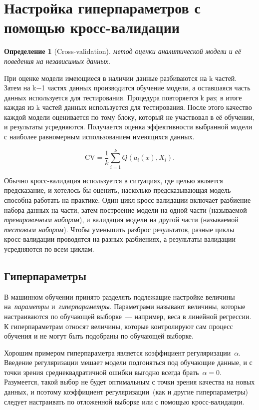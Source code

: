 \documentclass[a4paper, 12pt]{article}
\theoremstyle{plain} %
\newtheorem{definition}{Определение}
\theoremstyle{definition} %
\theoremstyle{remark} %
\begin{document}
\section{Настройка гиперпараметров с помощью кросс-валидации}

\begin{definition}[Cross-validation]
	метод оценки аналитической модели и её поведения на независимых данных.
\end{definition}
	При оценке модели имеющиеся в наличии данные разбиваются на k частей. Затем на k−1 частях данных производится обучение модели, а оставшаяся часть данных используется для тестирования. Процедура повторяется k раз; в итоге каждая из k частей данных используется для тестирования. После этого качество каждой модели оценивается по тому блоку, который не участвовал в её обучении,
	и результаты усредняются. Получается оценка эффективности выбранной модели с наиболее равномерным использованием имеющихся данных.

	\[
	    \text{CV}
	    =
	    \frac{1}{k}
	    \sum_{i = 1}^{k}
	        Q\left( a_i(x), X_i \right).
	\]

\vspace{1em}
	Обычно кросс-валидация используется в ситуациях, где целью является предсказание, и хотелось бы оценить, насколько предсказывающая модель способна работать на практике. Один цикл кросс-валидации включает разбиение набора данных на части, затем построение модели на одной части (называемой \emph{тренировочным набором}), и валидация модели на другой части (называемой \emph{тестовым набором}). Чтобы уменьшить разброс результатов, разные циклы кросс-валидации проводятся на разных разбиениях, а результаты валидации усредняются по всем циклам.

\subsection{Гиперпараметры}

	В машинном обучении принято разделять подлежащие настройке величины
	на~\emph{параметры} и~\emph{гиперпараметры}.
	Параметрами называют величины, которые настраиваются по обучающей выборке~--- например,
	веса в линейной регрессии.
	К гиперпараметрам относят величины, которые контролируют сам процесс обучения и
	не могут быть подобраны по обучающей выборке.

	Хорошим примером гиперпараметра является коэффициент регуляризации~$\alpha$.
	Введение регуляризации мешает модели подгоняться под обучающие данные,
	и с точки зрения среднеквадратичной ошибки выгодно всегда брать~$\alpha = 0$.
	Разумеется, такой выбор не будет оптимальным с точки зрения качества на новых данных,
	и поэтому коэффициент регуляризации~(как и другие гиперпараметры) следует
	настраивать по отложенной выборке или с помощью кросс-валидации.
\end{document}
